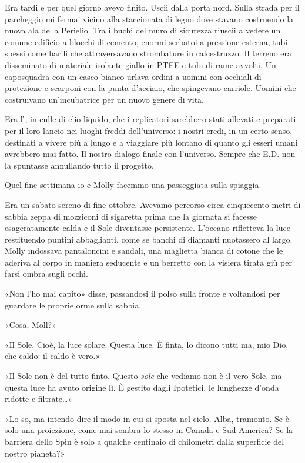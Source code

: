 Era tardi e per quel giorno avevo finito. Uscii dalla porta nord. Sulla
strada per il parcheggio mi fermai vicino alla staccionata di legno dove
stavano costruendo la nuova ala della Perielio. Tra i buchi del muro di
sicurezza riuscii a vedere un comune edificio a blocchi di cemento,
enormi serbatoi a pressione esterna, tubi spessi come barili che
attraversavano strombature in calcestruzzo. Il terreno era disseminato
di materiale isolante giallo in PTFE e tubi di rame avvolti. Un
caposquadra con un casco bianco urlava ordini a uomini con occhiali di
protezione e scarponi con la punta d'acciaio, che spingevano carriole.
Uomini che costruivano un'incubatrice per un nuovo genere di vita.

Era lì, in culle di elio liquido, che i replicatori sarebbero stati
allevati e preparati per il loro lancio nei luoghi freddi dell'universo:
i nostri eredi, in un certo senso, destinati a vivere più a lungo e a
viaggiare più lontano di quanto gli esseri umani avrebbero mai fatto. Il
nostro dialogo finale con l'universo. Sempre che E.D. non la spuntasse
annullando tutto il progetto.

\separatorefiori

Quel fine settimana io e Molly facemmo una passeggiata sulla spiaggia.

Era un sabato sereno di fine ottobre. Avevamo percorso circa cinquecento
metri di sabbia zeppa di mozziconi di sigaretta prima che la giornata si
facesse esageratamente calda e il Sole diventasse persistente. L'oceano
rifletteva la luce restituendo puntini abbaglianti, come se banchi di
diamanti nuotassero al largo. Molly indossava pantaloncini e sandali,
una maglietta bianca di cotone che le aderiva al corpo in maniera
seducente e un berretto con la visiera tirata giù per farsi ombra sugli
occhi.

«Non l'ho mai capito» disse, passandosi il polso sulla fronte e
voltandosi per guardare le proprie orme sulla sabbia.

«Cosa, Moll?»

«Il Sole. Cioè, la luce solare. Questa luce. È finta, lo dicono tutti
ma, mio Dio, che caldo: il caldo è vero.»

«Il Sole non è del tutto finto. Questo \emph{sole} che vediamo non è il
vero Sole, ma questa luce ha avuto origine lì. È gestito dagli
Ipotetici, le lunghezze d'onda ridotte e filtrate\ldots»

«Lo so, ma intendo dire il modo in cui si sposta nel cielo. Alba,
tramonto. Se è solo una proiezione, come mai sembra lo stesso in Canada
e Sud America? Se la barriera dello Spin è solo a qualche centinaio di
chilometri dalla superficie del nostro pianeta?»

